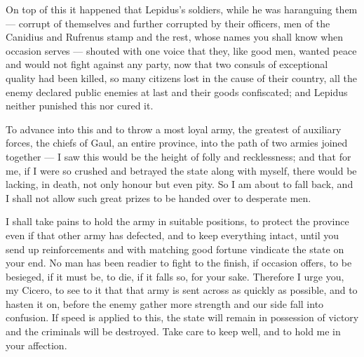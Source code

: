  On top of this it happened that Lepidus's soldiers, while he was haranguing them --- corrupt of themselves and further corrupted by their officers, men of the Canidius and Rufrenus stamp and the rest, whose names you shall know when occasion serves --- shouted with one voice that they, like good men, wanted peace and would not fight against any party, now that two consuls of exceptional quality had been killed, so many citizens lost in the cause of their country, all the enemy declared public enemies at last and their goods confiscated; and Lepidus neither punished this nor cured it.

 To advance into this and to throw a most loyal army, the greatest of auxiliary forces, the chiefs of Gaul, an entire province, into the path of two armies joined together --- I saw this would be the height of folly and recklessness; and that for me, if I were so crushed and betrayed the state along with myself, there would be lacking, in death, not only honour but even pity. So I am about to fall back, and I shall not allow such great prizes to be handed over to desperate men.

 I shall take pains to hold the army in suitable positions, to protect the province even if that other army has defected, and to keep everything intact, until you send up reinforcements and with matching good fortune vindicate the state on your end. No man has been readier to fight to the finish, if occasion offers, to be besieged, if it must be, to die, if it falls so, for your sake. Therefore I urge you, my Cicero, to see to it that that army is sent across as quickly as possible, and to hasten it on, before the enemy gather more strength and our side fall into confusion. If speed is applied to this, the state will remain in possession of victory and the criminals will be destroyed. Take care to keep well, and to hold me in your affection.
